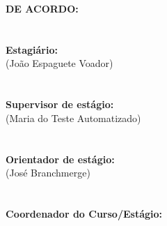 \documentclass[12pt]{article}
\begin{document}
    \pagebreak
    \noindent
    \fontsize{14pt}{14}\selectfont \textbf{DE ACORDO:}\\\\\\
    {
        \noindent
        \fontsize{12pt}{12}\selectfont 
        \textbf{Estagiário:}\uline{\hfill}\\
        \hspace*{\fill} (João Espaguete Voador)\\\\\\
        \textbf{Supervisor de estágio:}\uline{\hfill}\\
        \hspace*{\fill} (Maria do Teste Automatizado)\\\\\\
        \textbf{Orientador de estágio:}\uline{\hfill}\\
        \hspace*{\fill} (José Branchmerge)\\\\\\
        \textbf{Coordenador do Curso/Estágio:}\uline{\hfill}\\

    }

\end{document}
